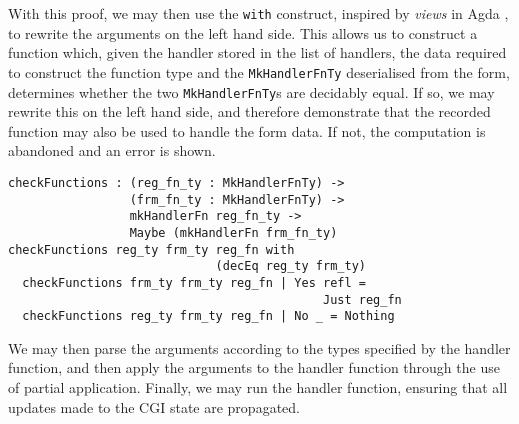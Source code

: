 With this proof, we may then use the \texttt{with} construct, inspired by \textit{views} in Agda \cite{mcbride.mckinna:viewfromleft}, to rewrite the arguments on the left hand side. This allows us to construct a function which, given the handler stored in the list of handlers, the data required to construct the function type and the \texttt{MkHandlerFnTy} deserialised from the form, determines whether the two \texttt{MkHandlerFnTy}s are decidably equal. If so, we may rewrite this on the left hand side, and therefore demonstrate that the recorded function may also be used to handle the form data. If not, the computation is abandoned and an error is shown. %
\begin{Verbatim}
checkFunctions : (reg_fn_ty : MkHandlerFnTy) -> 
                 (frm_fn_ty : MkHandlerFnTy) -> 
                 mkHandlerFn reg_fn_ty -> 
                 Maybe (mkHandlerFn frm_fn_ty)
checkFunctions reg_ty frm_ty reg_fn with 
                             (decEq reg_ty frm_ty)
  checkFunctions frm_ty frm_ty reg_fn | Yes refl = 
                                            Just reg_fn
  checkFunctions reg_ty frm_ty reg_fn | No _ = Nothing
\end{Verbatim}
We may then parse the arguments according to the types specified by the handler function, and then apply the arguments to the handler function through the use of partial application. Finally, we may run the handler function, ensuring that all updates made to the CGI state are propagated.


